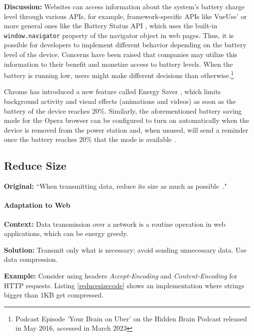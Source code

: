\textbf{Discussion:} Websites can access information about the system's battery charge level through various APIs, for example, framework-specific APIs like VueUse'  or more general ones like the Battery Status API \cite{dev-mozilla-battery-status-api}, which uses the built-in \texttt{window.navigator} property of the navigator object in web pages. Thus, it is possible for developers to implement different behavior depending on the battery level of the device. Concerns have been raised that companies may utilize this information to their benefit and monetize access to battery levels. When the battery is running low, users might make different decisions than otherwise.\footnote{Podcast Episode 'Your Brain on Uber' on the Hidden Brain Podcast released in May 2016, accessed in March 2023}

Chrome has introduced a new feature called Energy Saver \cite{chrome_new_feature}, which limits background activity and visual effects (\eg animations and videos) as soon as the battery of the device reaches 20\%. Similarly, the aforementioned battery saving mode for the Opera browser can be configured to turn on automatically when the device is removed from the power station and, when unused, will send a reminder once the battery reaches 20\% that the mode is available \cite{opera-battery-saver}.

\subsection{Reduce Size} \label{sec:patterns-ReduceSize}
\textbf{Original:} ``When transmitting data, reduce its size as much as possible~\cite{cruz2019catalog}."

\paragraph{Adaptation to Web}\mbox{}

\textbf{Context:} Data transmission over a network is a routine operation in web applications, which can be energy greedy.

\textbf{Solution:} Transmit only what is necessary; avoid sending unnecessary data. Use data compression.

\textbf{Example:} Consider using headers \emph{Accept-Encoding} and \emph{Content-Encoding} for HTTP requests. Listing \ref{reducesizecode} shows an implementation where strings bigger than 1KB get compressed.


